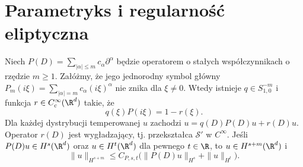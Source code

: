 \section{Parametryks i regularność eliptyczna}
\begin{twierdzenie}
\label{thm:pde31-parametrix}
Niech $P(D)=\sum_{|\alpha|\le m}c_\alpha\partial^\alpha$
będzie operatorem o stałych współczynnikach o rzędzie $m\ge1$.
Załóżmy, że jego jednorodny symbol główny
$P_m(i\xi)=\sum_{|\alpha|=m}c_\alpha(i\xi)^\alpha$
nie znika dla $\xi\ne0$. Wtedy istnieje
$q\in S^{-m}_{1,0}$ i funkcja $r\in C_c^\infty(\R^d)$
takie, że
\begin{equation}\label{eq:pde31-param}
 q(\xi)P(i\xi)=1-r(\xi).
\end{equation}
Dla każdej dystrybucji temperowanej $u$ zachodzi
$u=q(D)P(D)u+r(D)u$. Operator $r(D)$ jest wygładzający,
tj. przekształca $\mathcal S'$ w $C^\infty$.
Jeśli $P(D)u\in H^s(\R^d)$ oraz $u\in H^t(\R^d)$ dla pewnego $t\in\R$,
to $u\in H^{s+m}(\R^d)$ i
\[
 \|u\|_{H^{s+m}}\le C_{P,s,t}
 \bigl(\|P(D)u\|_{H^s}+\|u\|_{H^t}\bigr).
\]
\end{twierdzenie}
